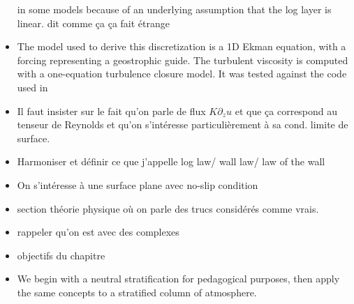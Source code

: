 \begin{itemize}
	in some models
	because of an underlying assumption that the log layer
		is linear. {\color{red} dit comme ça ça fait étrange}
	\item The model used to derive this discretization is a 1D Ekman
	equation, with a forcing representing a geostrophic guide.
		The turbulent viscosity is computed with a
		one-equation turbulence closure model. It was
		tested against the code used in \cite{lemarie_simplified_2021}
\item Il faut insister sur le fait qu'on parle de flux $K\partial_z u$
	et que ça correspond au tenseur de Reynolds et qu'on s'intéresse
		particulièrement à sa cond. limite de surface.
\item Harmoniser et définir ce que j'appelle log law/ wall law/ law of the wall
\item On s'intéresse à une surface plane avec no-slip condition
\item section théorie physique où on parle des trucs considérés comme
	vrais.
\item rappeler qu'on est avec des complexes
\item {\color{red} objectifs du chapitre}
\item We begin with a neutral stratification for pedagogical purposes,
	then apply the same concepts to a stratified column of
		atmosphere.
\end{itemize}
